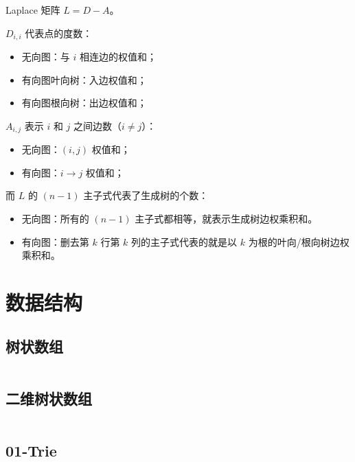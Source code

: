 \documentclass{article}
\begin{document}
Laplace 矩阵 $L=D-A$。



\begin{minipage}[t]{0.45\textwidth}
    $D_{i,i}$ 代表点的度数：
    \begin{itemize}[noitemsep, topsep=-5pt]
        \item 无向图：与 $i$ 相连边的权值和；
        \item 有向图叶向树：入边权值和；
        \item 有向图根向树：出边权值和；
    \end{itemize}
\end{minipage}
\hfill
\begin{minipage}[t]{0.45\textwidth}
    $A_{i,j}$ 表示 $i$ 和 $j$ 之间边数（$i\ne j$）：
    \begin{itemize}[noitemsep, topsep=-5pt]
        \item 无向图：$(i,j)$ 权值和；
        \item 有向图：$i\to j$ 权值和；
    \end{itemize}
\end{minipage}
\bigskip

而 $L$ 的 $(n-1)$ 主子式代表了生成树的个数：
\begin{itemize}[noitemsep, topsep=-5pt]
    \item 无向图：所有的 $(n-1)$ 主子式都相等，就表示生成树边权乘积和。
    \item 有向图：删去第 $k$ 行第 $k$ 列的主子式代表的就是以 $k$ 为根的叶向/根向树边权乘积和。
\end{itemize}


\section{数据结构}


\subsection{树状数组}
\inputminted[breaklines, frame=single]{c++}{../algo/数据结构/树状数组.cpp}


\subsection{二维树状数组}
\inputminted[breaklines, frame=single]{c++}{../algo/数据结构/二维树状数组.cpp}

\subsection{01-Trie}
\inputminted[breaklines, frame=single]{c++}{../algo/数据结构/01-trie.cpp}
\end{document}

